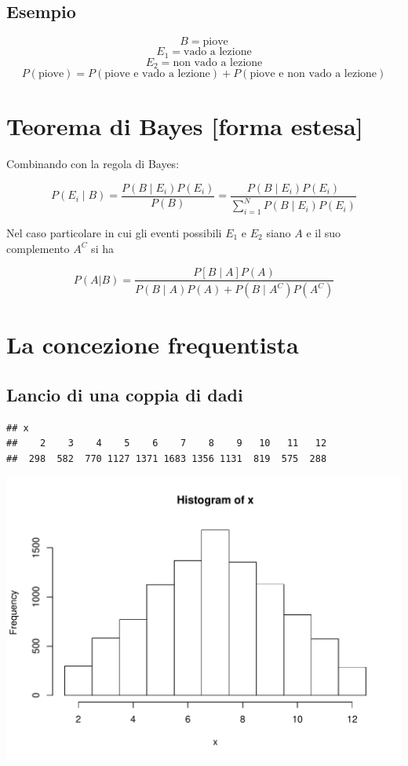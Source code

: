 \documentclass[onecolumn,12pt]{book}\usepackage[]{graphicx}\usepackage[]{color}
\makeatletter
\def\maxwidth{ %
  \ifdim\Gin@nat@width>\linewidth
    \linewidth
  \else
    \Gin@nat@width
  \fi
}
\newenvironment{kframe}{%
 \def\at@end@of@kframe{}%
 \ifinner\ifhmode%
  \def\at@end@of@kframe{\end{minipage}}%
  \begin{minipage}{\columnwidth}%
 \fi\fi%
 \def\FrameCommand##1{\hskip\@totalleftmargin \hskip-\fboxsep
 \colorbox{shadecolor}{##1}\hskip-\fboxsep
     \hskip-\linewidth \hskip-\@totalleftmargin \hskip\columnwidth}%
 \MakeFramed {\advance\hsize-\width
   \@totalleftmargin\z@ \linewidth\hsize
   \@setminipage}}%
 {\par\unskip\endMakeFramed%
 \at@end@of@kframe}
\newenvironment{knitrout}{}{} %
\makeatother
\begin{document}
\subsection{Esempio}

$$B=\textrm{piove}$$
$$E_1 = \textrm{vado a lezione}$$
$$E_2 = \textrm{non vado a lezione}$$
$$P(\textrm{piove}) = P(\textrm{piove e vado a lezione}) + P(\textrm{piove e non vado a lezione}) $$ 

 

\section{Teorema di Bayes [forma estesa]}

Combinando con la regola di Bayes:

$$P (E_i\mid B) = \dfrac{P(B\mid E_i) P(E_i)}{P(B)}= \dfrac{P(B\mid E_i ) P(E_i) }{ 
\sum_{i=1}^N P(B\mid E_i)P(E_i)}$$

Nel caso particolare in cui gli eventi possibili 
$E_1$ e $E_2$ siano $A$ e il suo complemento  $A^C$ si ha

$$P (A|B)=  \dfrac{P[B\mid A] P(A)}{P (B\mid A) P(A)+P(B\mid  A^C) P( A^C)}$$


 
 


\section{La concezione frequentista}
 

\subsection{Lancio di una coppia di dadi}

\begin{knitrout}
\color{fgcolor}\begin{kframe}
\begin{verbatim}
## x
##    2    3    4    5    6    7    8    9   10   11   12 
##  298  582  770 1127 1371 1683 1356 1131  819  575  288
\end{verbatim}
\end{kframe}
\includegraphics[width=\maxwidth]{figure/unnamed-chunk-15-1} 

\end{knitrout}
\end{document}
